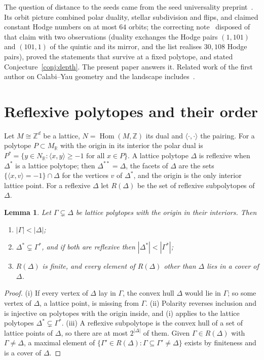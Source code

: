 \documentclass[manuscript]{aomart}
\newtheorem{lemma}[theorem]{Lemma}
\theoremstyle{definition}
\theoremstyle{remark}
\newcommand{\R}{\mathbb{R}}
\newcommand{\Z}{\mathbb{Z}}
\newcommand{\ip}[2]{\langle #1,#2\rangle}
\DeclareMathOperator{\Hom}{Hom}
\begin{document}
The question of distance to the seeds came from the seed universality
preprint~\cite{Bha26a}. Its orbit picture combined polar duality, stellar
subdivision and flips, and claimed constant Hodge numbers on at most $64$
orbits; the correcting note~\cite{Bha26b} disposed of that claim with two
observations (duality exchanges the Hodge pairs $(1,101)$ and $(101,1)$ of
the quintic and its mirror, and the list realises $30{,}108$ Hodge pairs),
proved the statements that survive at a fixed polytope, and stated
Conjecture~\ref{conj:depth}. The present paper answers it. Related work of
the first author on Calabi--Yau geometry and the landscape
includes~\cite{Bha26c}.

\section{Reflexive polytopes and their order}\label{sec:prelim}

Let $M\cong\Z^d$ be a lattice, $N=\Hom(M,\Z)$ its dual and
$\ip{\cdot}{\cdot}$ the pairing. For a polytope $P\subset M_\R$ with the
origin in its interior the polar dual is
$P^*=\{y\in N_\R:\ip{x}{y}\ge-1\text{ for all }x\in P\}$. A lattice polytope
$\Delta$ is reflexive when $\Delta^*$ is a lattice polytope; then
$\Delta^{**}=\Delta$, the facets of $\Delta$ are the sets
$\{\ip{x}{v}=-1\}\cap\Delta$ for the vertices $v$ of $\Delta^*$, and the
origin is the only interior lattice point. For a reflexive $\Delta$ let
$R(\Delta)$ be the set of reflexive subpolytopes of $\Delta$.

\begin{lemma}\label{lem:basic}
Let $\Gamma\subsetneq\Delta$ be lattice polytopes with the origin in their
interiors. Then
\begin{enumerate}[label=\textup{(\roman*)},leftmargin=*]
\item $|\Gamma|<|\Delta|$;
\item $\Delta^*\subsetneq\Gamma^*$, and if both are reflexive then
$|\Delta^*|<|\Gamma^*|$;
\item $R(\Delta)$ is finite, and every element of $R(\Delta)$ other than
$\Delta$ lies in a cover of $\Delta$.
\end{enumerate}
\end{lemma}

\begin{proof}
(i) If every vertex of $\Delta$ lay in $\Gamma$, the convex hull $\Delta$
would lie in $\Gamma$; so some vertex of $\Delta$, a lattice point, is
missing from $\Gamma$. (ii) Polarity reverses inclusion and is injective
on polytopes with the origin inside, and (i) applies to the lattice
polytopes $\Delta^*\subsetneq\Gamma^*$. (iii) A reflexive subpolytope is
the convex hull of a set of lattice points of $\Delta$, so there are at
most $2^{|\Delta|}$ of them. Given $\Gamma\in R(\Delta)$ with
$\Gamma\ne\Delta$, a maximal element of
$\{\Gamma'\in R(\Delta):\Gamma\subseteq\Gamma'\ne\Delta\}$ exists by
finiteness and is a cover of $\Delta$.
\end{proof}
\end{document}
